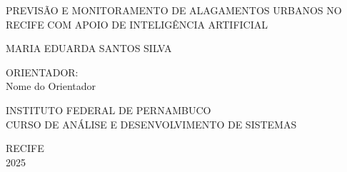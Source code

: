 \thispagestyle{empty}
\begin{center}
    \vspace*{2cm}
    
    {\ABNTEXchapterfont\LARGE PREVISÃO E MONITORAMENTO DE ALAGAMENTOS URBANOS NO RECIFE COM APOIO DE INTELIGÊNCIA ARTIFICIAL}

    \vspace{4cm}
    
    {\ABNTEXchapterfont\large MARIA EDUARDA SANTOS SILVA}
    
    \vfill
    
    {\large ORIENTADOR:} \\
    {\large Nome do Orientador} 
    
    \vspace{2cm}
    
    {\large INSTITUTO FEDERAL DE PERNAMBUCO} \\
    {\large CURSO DE ANÁLISE E DESENVOLVIMENTO DE SISTEMAS}
    
    \vspace{2cm}
    
    {\large RECIFE} \\
    {\large 2025}
\end{center}
\clearpage